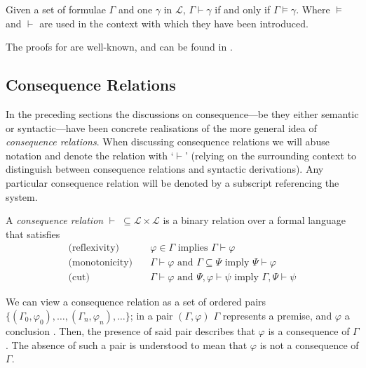 \begin{definition}
     \label{definition:completeness-hilbert} 
Given a set of formulae $\Gamma$ and one $\gamma$ in $\mathcal{L}$, $\Gamma \vdash \gamma$ if and only if $\Gamma \vDash \gamma$. Where $\vDash$ and $\vdash$ are used in the context with which they have been introduced.
\end{definition}

The proofs for  are well-known, and can be found in \cite[p. 64]{Ben1993Mathematical}. 

\label{subsubsection:gentzen-systems}

\subsection{Consequence Relations} 
\label{subsection:consequence-relations}

In the preceding sections the discussions on consequence---be they either semantic or syntactic---have been concrete realisations of the more general idea of \textit{consequence relations}. When discussing consequence relations we will abuse notation and denote the relation with `$\vdash$' (relying on the surrounding context to distinguish between consequence relations and syntactic derivations). Any particular consequence relation will be denoted by a subscript referencing the system. 

\begin{definition}
\label{definition:consequence-relations}
A \textit{consequence relation} $\vdash \; \subseteq \mathcal{L} \times \mathcal{L}$ is a binary relation over a formal language that satisfies 
\begin{align}
     \text{(reflexivity)} \quad & \varphi \in \Gamma \text{ implies } \Gamma \vdash \varphi \\ 
     \text{(monotonicity)} \quad & \Gamma \vdash \varphi \text{ and } \Gamma \subseteq \Psi \text{ imply } \Psi \vdash \varphi \\
     \text{(cut)} \quad & \Gamma \vdash \varphi \text{ and } \Psi,\varphi \vdash \psi \text{ imply } \Gamma, \Psi \vdash \psi  
\end{align}
\end{definition}

We can view a consequence relation as a set of ordered pairs $\{(\Gamma_0, \varphi_0), \ldots, (\Gamma_n, \varphi_n), \ldots\}$; in a pair $(\Gamma, \varphi)$ $\Gamma$ represents a premise, and $\varphi$ a conclusion \cite[p. 16]{citkin2022consequence}. Then, the presence of said pair describes that $\varphi$ is a consequence of $\Gamma$. The absence of such a pair is understood to mean that $\varphi$ is not a consequence of $\Gamma$.

